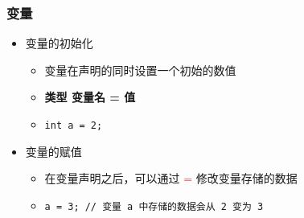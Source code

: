 \begin{frame}[fragile]
    \frametitle{变量}

    \begin{itemize}
        \item<1-> 变量的初始化

            \begin{itemize}
                \item 变量在声明的同时设置一个初始的数值
                \item \textbf{类型 \enspace 变量名 = 值}
                \item \lstinline|int a = 2;|
            \end{itemize}

        \item<2-> 变量的赋值

            \begin{itemize}
                \item 在变量声明之后，可以通过 \textcolor{red}{=} 修改变量存储的数据
                \item \lstinline|a = 3; // 变量 a 中存储的数据会从 2 变为 3|
            \end{itemize}

    \end{itemize}
\end{frame}

